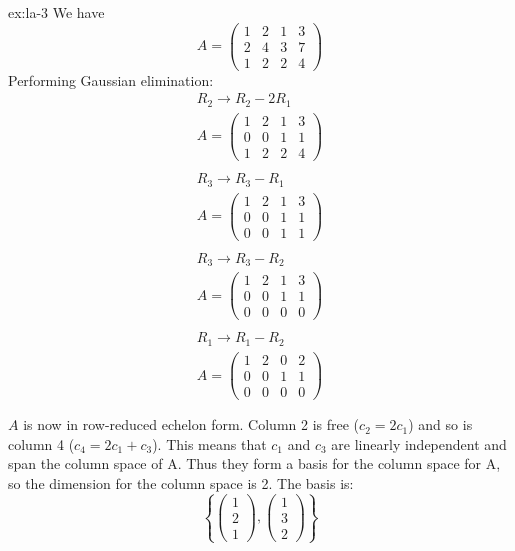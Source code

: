 \begin{solution}{ex:la-3}
  We have
  \[
    A=\begin{pmatrix}1&2&1&3\\2&4&3&7\\1&2&2&4\end{pmatrix}
  \]
  Performing Gaussian elimination:\\

  \begin{align*}
    R_2\rightarrow R_2-2R_1\\
    A=\begin{pmatrix}1&2&1&3\\0&0&1&1\\1&2&2&4\end{pmatrix}\\\\
    R_3\rightarrow R_3-R_1\\
    A=\begin{pmatrix}1&2&1&3\\0&0&1&1\\0&0&1&1\end{pmatrix}\\\\
    R_3\rightarrow R_3-R_2\\
    A=\begin{pmatrix}1&2&1&3\\0&0&1&1\\0&0&0&0\end{pmatrix}\\\\
    R_1\rightarrow R_1-R_2\\
    A=\begin{pmatrix}1&2&0&2\\0&0&1&1\\0&0&0&0\end{pmatrix}\\\\
  \end{align*}
  $A$ is now in row-reduced echelon form. Column 2 is free ($c_2=2c_1$) and so is column 4 ($c_4=2c_1+c_3$). This means that $c_1$ and $c_3$ are linearly independent and span the column space of A. Thus they form a basis for the column space for A, so the dimension for the column space is 2. The basis is:
  \[
    \left\{\begin{pmatrix}1\\2\\1\end{pmatrix},\begin{pmatrix}1\\3\\2\end{pmatrix}\right\}
  \]
\end{solution}

